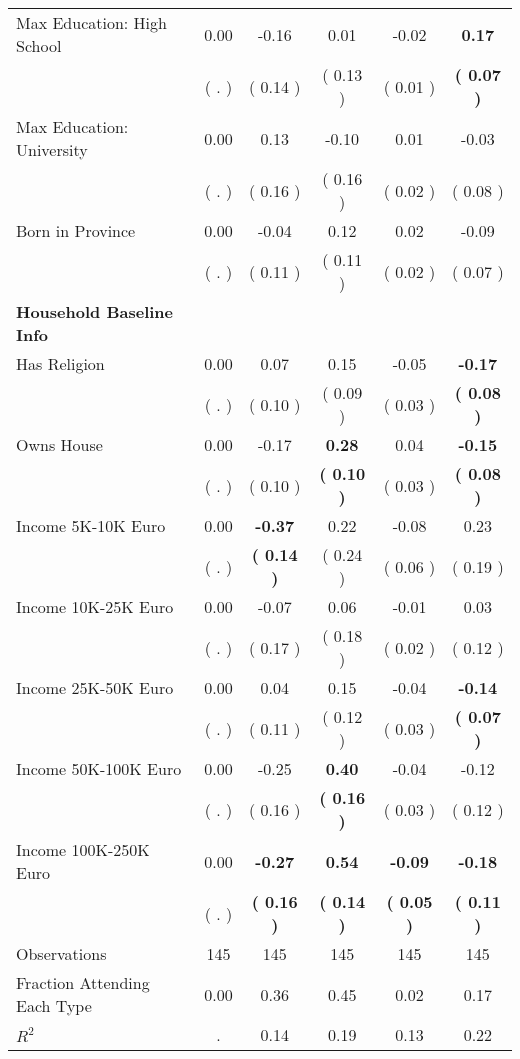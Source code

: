 \begin{table}[H]
{\begin{tabular}{lccccc}
\quad Max Education: High School &      0.00 &     -0.16 &      0.01 &     -0.02 & \textbf{     0.17} \\
\quad  & (        . ) & (     0.14 )  & (     0.13 )  & (     0.01 ) & \textbf{(     0.07 )} \\
\quad Max Education: University &      0.00 &      0.13 &     -0.10 &      0.01 &     -0.03 \\
\quad  & (        . ) & (     0.16 )  & (     0.16 )  & (     0.02 ) & (     0.08 ) \\
\quad Born in Province &      0.00 &     -0.04 &      0.12 &      0.02 &     -0.09 \\
\quad  & (        . ) & (     0.11 )  & (     0.11 )  & (     0.02 ) & (     0.07 ) \\
\midrule
\textbf{Household Baseline Info} \\
\quad Has Religion &      0.00 &      0.07 &      0.15 &     -0.05 & \textbf{    -0.17} \\
\quad  & (        . ) & (     0.10 )  & (     0.09 )  & (     0.03 ) & \textbf{(     0.08 )} \\
\quad Owns House &      0.00 &     -0.17 & \textbf{     0.28} &      0.04 & \textbf{    -0.15} \\
\quad  & (        . ) & (     0.10 )  & \textbf{(     0.10 )}  & (     0.03 ) & \textbf{(     0.08 )} \\
\quad Income 5K-10K Euro &      0.00 & \textbf{    -0.37} &      0.22 &     -0.08 &      0.23 \\
\quad  & (        . ) & \textbf{(     0.14 )}  & (     0.24 )  & (     0.06 ) & (     0.19 ) \\
\quad Income 10K-25K Euro &      0.00 &     -0.07 &      0.06 &     -0.01 &      0.03 \\
\quad  & (        . ) & (     0.17 )  & (     0.18 )  & (     0.02 ) & (     0.12 ) \\
\quad Income 25K-50K Euro &      0.00 &      0.04 &      0.15 &     -0.04 & \textbf{    -0.14} \\
\quad  & (        . ) & (     0.11 )  & (     0.12 )  & (     0.03 ) & \textbf{(     0.07 )} \\
\quad Income 50K-100K Euro &      0.00 &     -0.25 & \textbf{     0.40} &     -0.04 &     -0.12 \\
\quad  & (        . ) & (     0.16 )  & \textbf{(     0.16 )}  & (     0.03 ) & (     0.12 ) \\
\quad Income 100K-250K Euro &      0.00 & \textbf{    -0.27} & \textbf{     0.54} & \textbf{    -0.09} & \textbf{    -0.18} \\
\quad  & (        . ) & \textbf{(     0.16 )}  & \textbf{(     0.14 )}  & \textbf{(     0.05 )} & \textbf{(     0.11 )} \\
\midrule
Observations & 145 & 145 & 145 & 145 & 145 \\
Fraction Attending Each Type &      0.00 &      0.36 &      0.45 &      0.02 &      0.17 \\
\midrule
$ R^2$ &         . &      0.14 &      0.19 &      0.13 &      0.22 \\
\bottomrule
\end{tabular}}
\end{table}
